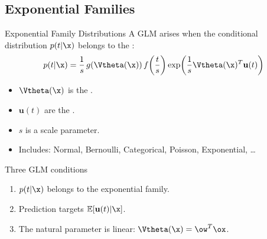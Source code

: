 \subsection{Exponential Families}

\begin{frame}{Exponential Family Distributions}
  A GLM arises when the conditional distribution $p(t|\x)$ belongs to the :
  \[
    p(t|\x) = \frac{1}{s}\,g(\Vtheta(\x))\,f\!\left(\frac{t}{s}\right)
    \exp\!\left(\frac{1}{s}\Vtheta(\x)^T\mathbf{u}(t)\right)
  \]
  \begin{itemize}
    \item $\Vtheta(\x)$ is the .
    \item $\mathbf{u}(t)$ are the .
    \item $s$ is a scale parameter.
    \item Includes: Normal, Bernoulli, Categorical, Poisson, Exponential, \ldots
  \end{itemize}
  \vspace{0.2cm}
  \begin{block}{Three GLM conditions}
    \begin{enumerate}
      \item $p(t|\x)$ belongs to the exponential family.
      \item Prediction targets $\mathbb{E}[\mathbf{u}(t)|\x]$.
      \item The natural parameter is linear: $\Vtheta(\x) = \ow^T\ox$.
    \end{enumerate}
  \end{block}
\end{frame}

